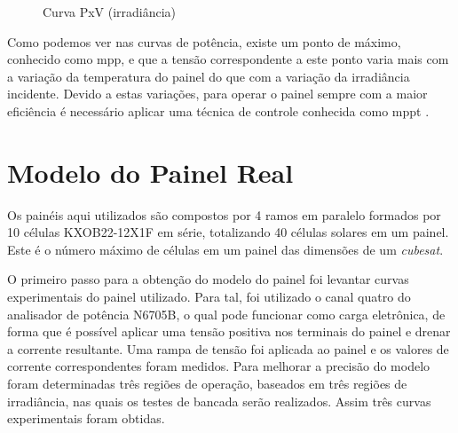\begin{figure}[!htpb]
\begin{minipage}{.5\textwidth}
\begin{center}
\caption{Curva PxV (irradiância)}
\label{figura_potência_painel_irradiância}
\end{center}
\end{minipage}
\end{figure}

Como podemos ver nas curvas de potência, existe um ponto de máximo, conhecido como \gls{mpp}, e que a tensão correspondente a este ponto varia mais com a variação da temperatura do painel do que com a variação da irradiância incidente. Devido a estas variações, para operar o painel sempre com a maior eficiência é necessário aplicar uma técnica de controle conhecida como \gls{mppt} \cite{ahmed2016}.

\section{Modelo do Painel Real}

Os painéis aqui utilizados são compostos por 4 ramos em paralelo formados por 10 células KXOB22-12X1F em série, totalizando 40 células solares em um painel. Este é o número máximo de células em um painel das dimensões de um \textit{cubesat}.

O primeiro passo para a obtenção do modelo do painel foi levantar curvas experimentais do painel utilizado. Para tal, foi utilizado o canal quatro do analisador de potência N6705B, o qual pode funcionar como carga eletrônica, de forma que é possível aplicar uma tensão positiva nos terminais do painel e drenar a corrente resultante. Uma rampa de tensão foi aplicada ao painel e os valores de corrente correspondentes foram medidos. Para melhorar a precisão do modelo foram determinadas três regiões de operação, baseados em três regiões de irradiância, nas quais os testes de bancada serão realizados. Assim três curvas experimentais foram obtidas.

